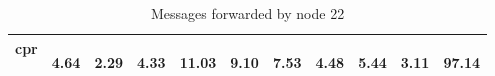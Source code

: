 \documentclass{article}
\begin{document}
\begin{table}[H]
\begin{center}
\begin{tabular}{|c|c|c|c|c|c|c|c|c|c|c|}
				    cpr & \begin{footnotesize}4.64\end{footnotesize} & \begin{footnotesize}2.29\end{footnotesize} & \begin{footnotesize}4.33\end{footnotesize} & \begin{footnotesize}11.03\end{footnotesize} & \begin{footnotesize}9.10\end{footnotesize} & \begin{footnotesize}7.53\end{footnotesize} & \begin{footnotesize}4.48\end{footnotesize} & \begin{footnotesize}5.44\end{footnotesize} & \begin{footnotesize}3.11\end{footnotesize} & \begin{footnotesize}97.14\end{footnotesize} \\ \hline
			    \end{tabular}
			\end{center}	
			\caption{Messages forwarded by node 22}
			\label{tab:25F22P2}
		\end{table}		
		
\end{document}
